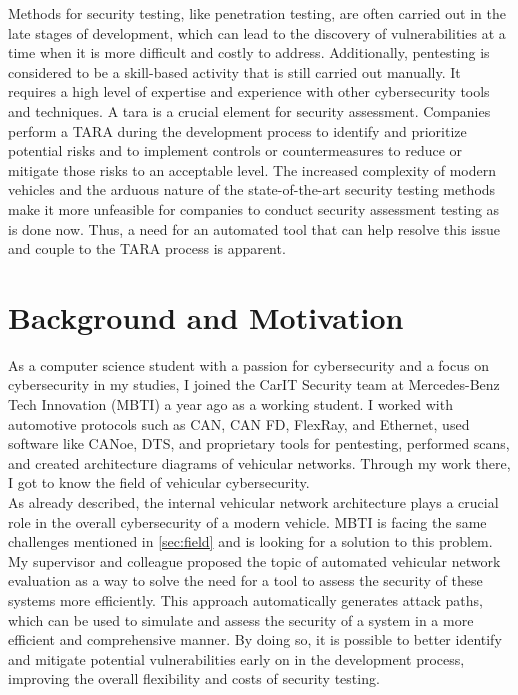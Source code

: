 Methods for security testing, like penetration testing, are often carried out in the late stages of development, which can lead to the discovery of vulnerabilities at a time when it is more difficult and costly to address.
Additionally, pentesting is considered to be a skill-based activity that is still carried out manually.
It requires a high level of expertise and experience with other cybersecurity tools and techniques. 
A \gls{tara} is a crucial element for security assessment. 
Companies perform a TARA during the development process to identify and prioritize potential risks and to implement controls or countermeasures to reduce or mitigate those risks to an acceptable level. 
The increased complexity of modern vehicles and the arduous nature of the state-of-the-art security testing methods make it more unfeasible for companies to conduct security assessment testing as is done now. 
Thus, a need for an automated tool that can help resolve this issue and couple to the TARA process is apparent. 


\section{Background and Motivation}
\label{sec:background}

As a computer science student with a passion for cybersecurity and a focus on cybersecurity in my studies, I joined the CarIT Security team at Mercedes-Benz Tech Innovation (MBTI) a year ago as a working student. 
I worked with automotive protocols such as CAN, CAN FD, FlexRay, and Ethernet, used software like CANoe, DTS, and proprietary tools for pentesting, performed scans, and created architecture diagrams of vehicular networks. 
Through my work there, I got to know the field of vehicular cybersecurity.
\\

As already described, the internal vehicular network architecture plays a crucial role in the overall cybersecurity of a modern vehicle. 
MBTI is facing the same challenges mentioned in \ref{sec:field} and is looking for a solution to this problem. 
My supervisor and colleague proposed the topic of automated vehicular network evaluation as a way to solve the need for a tool to assess the security of these systems more efficiently. 
This approach automatically generates attack paths, which can be used to simulate and assess the security of a system in a more efficient and comprehensive manner. 
By doing so, it is possible to better identify and mitigate potential vulnerabilities early on in the development process, improving the overall flexibility and costs of security testing. 